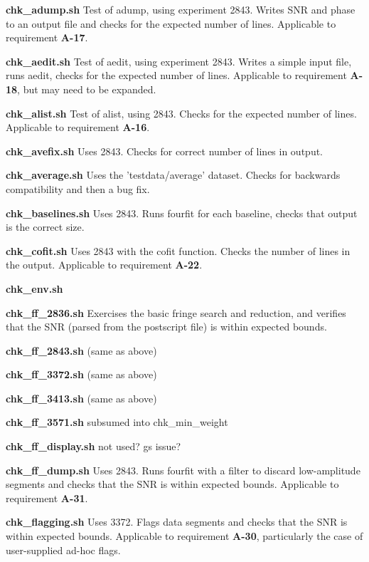 \begin{description}

\item{\textbf{chk\_adump.sh}} Test of adump, using experiment 2843. Writes SNR and phase to an output file and checks for the expected number of lines. Applicable to requirement \textbf{A-17}.
\item{\textbf{chk\_aedit.sh}} Test of aedit, using experiment 2843. Writes a simple input file, runs aedit, checks for the expected number of lines. Applicable to requirement \textbf{A-18}, but may need to be expanded.
\item{\textbf{chk\_alist.sh}} Test of alist, using 2843. Checks for the expected number of lines. Applicable to requirement \textbf{A-16}.
\item{\textbf{chk\_avefix.sh}} Uses 2843. Checks for correct number of lines in output.
\item{\textbf{chk\_average.sh}} Uses the 'testdata/average' dataset. Checks for backwards compatibility and then a bug fix. 
\item{\textbf{chk\_baselines.sh}} Uses 2843. Runs fourfit for each baseline, checks that output is the correct size.
\item{\textbf{chk\_cofit.sh}} Uses 2843 with the cofit function. Checks the number of lines in the output. Applicable to requirement \textbf{A-22}.
\item{\textbf{chk\_env.sh}} 
\item{\textbf{chk\_ff\_2836.sh}} Exercises the basic fringe search and reduction, and verifies that the SNR (parsed from the postscript file) is within expected bounds.
\item{\textbf{chk\_ff\_2843.sh}} (same as above)
\item{\textbf{chk\_ff\_3372.sh}} (same as above)
\item{\textbf{chk\_ff\_3413.sh}} (same as above)
\item{\textbf{chk\_ff\_3571.sh}} subsumed into chk\_min\_weight
\item{\textbf{chk\_ff\_display.sh}} not used? gs issue?
\item{\textbf{chk\_ff\_dump.sh}} Uses 2843. Runs fourfit with a filter to discard low-amplitude segments and checks that the SNR is within expected bounds. Applicable to requirement \textbf{A-31}.
\item{\textbf{chk\_flagging.sh}} Uses 3372. Flags data segments and checks that the SNR is within expected bounds. Applicable to requirement \textbf{A-30}, particularly the case of user-supplied ad-hoc flags.

\end{description}
